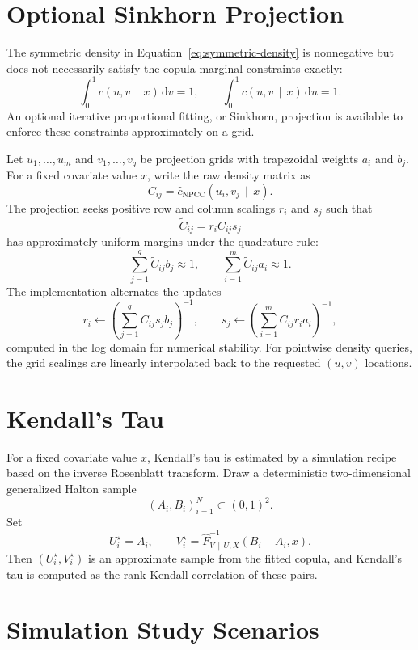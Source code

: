 \documentclass[11pt]{article}
\newcommand{\dd}{\,\mathrm{d}}
\newcommand{\given}{\,\mid\,}
\newcommand{\npcc}{\mathrm{NPCC}}
\begin{document}
\section{Optional Sinkhorn Projection}
\label{sec:sinkhorn}

The symmetric density in Equation~\eqref{eq:symmetric-density} is
nonnegative but does not necessarily satisfy the copula marginal
constraints exactly:
\[
  \int_0^1 c(u,v \given x)\dd v = 1,
  \qquad
  \int_0^1 c(u,v \given x)\dd u = 1.
\]
An optional iterative proportional fitting, or Sinkhorn, projection is
available to enforce these constraints approximately on a grid.

Let $u_1,\dots,u_m$ and $v_1,\dots,v_q$ be projection grids with
trapezoidal weights $a_i$ and $b_j$. For a fixed covariate value $x$,
write the raw density matrix as
\[
  C_{ij} = \widehat c_{\npcc}(u_i,v_j \given x).
\]
The projection seeks positive row and column scalings $r_i$ and $s_j$
such that
\[
  \widetilde C_{ij} = r_i C_{ij} s_j
\]
has approximately uniform margins under the quadrature rule:
\[
  \sum_{j=1}^q \widetilde C_{ij} b_j \approx 1,
  \qquad
  \sum_{i=1}^m \widetilde C_{ij} a_i \approx 1.
\]
The implementation alternates the updates
\[
  r_i
  \leftarrow
  \left(\sum_{j=1}^q C_{ij}s_j b_j\right)^{-1},
  \qquad
  s_j
  \leftarrow
  \left(\sum_{i=1}^m C_{ij}r_i a_i\right)^{-1},
\]
computed in the log domain for numerical stability. For pointwise
density queries, the grid scalings are linearly interpolated back to the
requested $(u,v)$ locations.

\section{Kendall's Tau}
\label{sec:kendall}

For a fixed covariate value $x$, Kendall's tau is estimated by a
simulation recipe based on the inverse Rosenblatt transform. Draw a
deterministic two-dimensional generalized Halton sample
\[
  (A_i,B_i)_{i=1}^N \subset (0,1)^2.
\]
Set
\[
  U_i^\star = A_i,
  \qquad
  V_i^\star =
  \widehat F^{-1}_{V \given U,X}(B_i \given A_i,x).
\]
Then $(U_i^\star,V_i^\star)$ is an approximate sample from the fitted
copula, and Kendall's tau is computed as the rank Kendall correlation of
these pairs.

\section{Simulation Study Scenarios}
\label{sec:scenarios}
\end{document}
